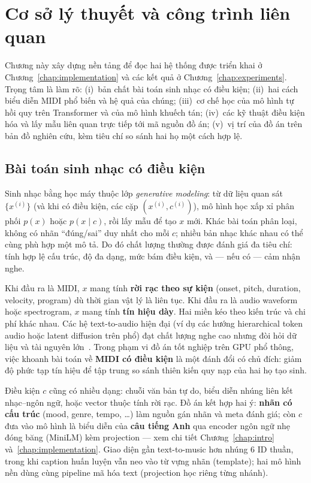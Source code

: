 \chapter{Cơ sở lý thuyết và công trình liên quan}
\label{chap:theory}

Chương này xây dựng nền tảng để đọc hai hệ thống được triển khai ở Chương~\ref{chap:implementation} và các kết quả ở Chương~\ref{chap:experiments}. Trọng tâm là làm rõ: (i)~bản chất bài toán sinh nhạc có điều kiện; (ii)~hai cách biểu diễn MIDI phổ biến và hệ quả của chúng; (iii)~cơ chế học của mô hình tự hồi quy trên Transformer và của mô hình khuếch tán; (iv)~các kỹ thuật điều kiện hóa và lấy mẫu liên quan trực tiếp tới mã nguồn đồ án; (v)~vị trí của đồ án trên bản đồ nghiên cứu, kèm tiêu chí so sánh hai họ một cách hợp lệ.

\section{Bài toán sinh nhạc có điều kiện}
\label{sec:ch2-cond-gen}

Sinh nhạc bằng học máy thuộc lớp \textit{generative modeling}: từ dữ liệu quan sát $\{x^{(i)}\}$ (và khi có điều kiện, các cặp $(x^{(i)}, c^{(i)})$), mô hình học xấp xỉ phân phối $p(x)$ hoặc $p(x\mid c)$, rồi lấy mẫu để tạo $x$ mới. Khác bài toán phân loại, không có nhãn ``đúng/sai'' duy nhất cho mỗi $c$; nhiều bản nhạc khác nhau có thể cùng phù hợp một mô tả. Do đó chất lượng thường được đánh giá đa tiêu chí: tính hợp lệ cấu trúc, độ đa dạng, mức bám điều kiện, và --- nếu có --- cảm nhận nghe.

Khi đầu ra là MIDI, $x$ mang tính \textbf{rời rạc theo sự kiện} (onset, pitch, duration, velocity, program) dù thời gian vật lý là liên tục. Khi đầu ra là audio waveform hoặc spectrogram, $x$ mang tính \textbf{tín hiệu dày}. Hai miền kéo theo kiến trúc và chi phí khác nhau. Các hệ text-to-audio hiện đại (ví dụ các hướng hierarchical token audio hoặc latent diffusion trên phổ) đạt chất lượng nghe cao nhưng đòi hỏi dữ liệu và tài nguyên lớn~\cite{agostinelli2023musiclm,copet2023musicgen,liu2023audioldm}. Trong phạm vi đồ án tốt nghiệp trên GPU phổ thông, việc khoanh bài toán về \textbf{MIDI có điều kiện} là một đánh đổi có chủ đích: giảm độ phức tạp tín hiệu để tập trung so sánh thiên kiến quy nạp của hai họ tạo sinh.

Điều kiện $c$ cũng có nhiều dạng: chuỗi văn bản tự do, biểu diễn nhúng liên kết nhạc--ngôn ngữ, hoặc vector thuộc tính rời rạc. Đồ án kết hợp hai ý: \textbf{nhãn có cấu trúc} (mood, genre, tempo, \ldots) làm nguồn gán nhãn và meta đánh giá; còn $c$ đưa vào mô hình là biểu diễn của \textbf{câu tiếng Anh} qua encoder ngôn ngữ nhẹ đóng băng (MiniLM) kèm projection --- xem chi tiết Chương~\ref{chap:intro} và~\ref{chap:implementation}. Giao diện gần text-to-music hơn nhúng 6 ID thuần, trong khi caption huấn luyện vẫn neo vào từ vựng nhãn (template); hai mô hình nền dùng cùng pipeline mã hóa text (projection học riêng từng nhánh).

